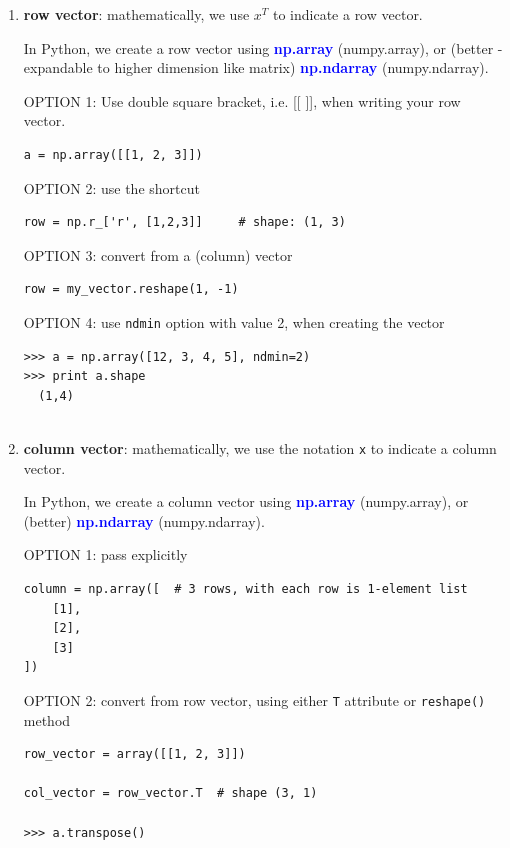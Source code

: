 \begin{enumerate}
  \item {\bf row vector}: mathematically, we use $x^T$ to indicate a row vector.
  
In Python, we create a row vector  using \textcolor{blue}{\bf np.array}
(numpy.array), or (better - expandable to higher dimension like matrix)
\textcolor{blue}{\bf np.ndarray} (numpy.ndarray).

OPTION 1: Use double square bracket, i.e. [[ ]], when writing your row vector.

\begin{lstlisting}
a = np.array([[1, 2, 3]])
\end{lstlisting}

OPTION 2: use the shortcut
\begin{lstlisting}
row = np.r_['r', [1,2,3]]     # shape: (1, 3)
\end{lstlisting}

OPTION 3: convert from a (column) vector
\begin{lstlisting}
row = my_vector.reshape(1, -1)
\end{lstlisting}

OPTION 4: use \verb!ndmin! option with value 2, when creating the vector
\begin{lstlisting}
>>> a = np.array([12, 3, 4, 5], ndmin=2)
>>> print a.shape
  (1,4)
  
\end{lstlisting}

  \item {\bf column vector}: mathematically, we use the notation \verb!x! to indicate a column vector. 


In Python, we create a column vector  using \textcolor{blue}{\bf np.array}
(numpy.array), or (better) \textcolor{blue}{\bf np.ndarray} (numpy.ndarray).

OPTION 1: pass explicitly

\begin{lstlisting}
column = np.array([  # 3 rows, with each row is 1-element list
    [1],
    [2],
    [3]
])
\end{lstlisting}

OPTION 2: convert from row vector, using either \verb!T! attribute or \verb!reshape()! method
\begin{lstlisting}
row_vector = array([[1, 2, 3]])

col_vector = row_vector.T  # shape (3, 1)

>>> a.transpose()



\end{lstlisting}
\end{enumerate}
